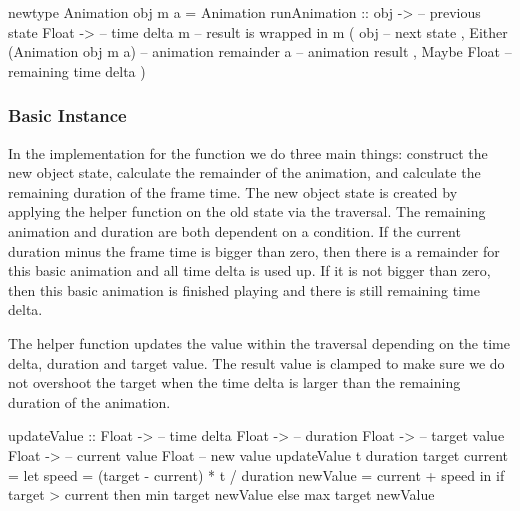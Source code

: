 \begin{code}
newtype Animation obj m a = Animation {
  runAnimation ::
    obj -> -- previous state
    Float -> -- time delta
    m -- result is wrapped in m
      ( obj -- next state
      , Either
          (Animation obj m a) -- animation remainder
          a -- animation result
      , Maybe Float -- remaining time delta
      )
}
\end{code}

\subsubsection{Basic Instance}

In the implementation for the  function we do three main things: construct the new object state, calculate the remainder of the animation, and calculate the remaining duration of the frame time. The new object state is created by applying the helper function  on the old state via the traversal. The remaining animation and duration are both dependent on a condition. If the current duration minus the frame time is bigger than zero, then there is a remainder for this basic animation and all time delta is used up. If it is not bigger than zero, then this basic animation is finished playing and there is still remaining time delta.


The  helper function updates the value within the traversal depending on the time delta, duration and target value. The result value is clamped to make sure we do not overshoot the target when the time delta is larger than the remaining duration of the animation.

\begin{code}
updateValue ::
  Float -> -- time delta
  Float -> -- duration
  Float -> -- target value
  Float -> -- current value
  Float -- new value
updateValue t duration target current = let
  speed = (target - current) * t / duration
  newValue = current + speed
  in if target > current
    then min target newValue
    else max target newValue
\end{code}


